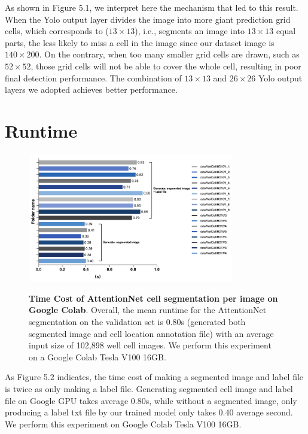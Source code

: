 As shown in Figure 5.1, we interpret here the mechanism that led to this result. When the Yolo output layer divides the image into more giant prediction grid cells, which corresponds to ($13\times13$), i.e., segments an image into $13\times13 $ equal parts, the less likely to miss a cell in the image since our dataset image is $140\times200$. On the contrary, when too many smaller grid cells are drawn, such as $ 52\times52$, those grid cells will not be able to cover the whole cell, resulting in poor final detection performance. The combination of $13\times13$ and $ 26\times26$ Yolo output layers we adopted achieves better performance. 

\section{Runtime}
\label{sec:ipsum}

\begin{figure}[h]
\begin{center}
\includegraphics[width=0.8\textwidth]{thesis-template-master/images/Duration (1).png}
\label{fig:cost}
\end{center}
\caption{\textbf{Time Cost of AttentionNet cell segmentation per image on Google Colab}. Overall, the mean runtime for the AttentionNet segmentation on the validation set is 0.80s (generated both segmented image and cell location annotation file) with an average input size of 102,898 well cell images. We perform this experiment on a  Google Colab Tesla V100 16GB.}
\end{figure}

As Figure 5.2 indicates, the time cost of making a segmented image and label file is twice as only making a label file. Generating segmented cell image and label file on Google GPU  takes average 0.80s, while without a segmented image, only producing a label txt file by our trained model only takes 0.40 average second. We perform this experiment on  Google Colab Tesla V100 16GB.

